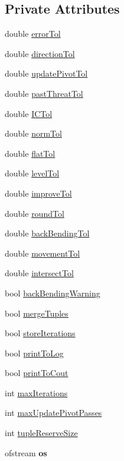 \subsection*{Private Attributes}
\begin{DoxyCompactItemize}
\item 
double \hyperlink{classSGEnv_a2b680d79a2bbb0e27b710bba29c6d407}{error\-Tol}
\item 
double \hyperlink{classSGEnv_a1e3560dd1c3ba8a6c4186dfaa1c5af4e}{direction\-Tol}
\item 
double \hyperlink{classSGEnv_a621566e738d47ab9929ffa704b05aa63}{update\-Pivot\-Tol}
\item 
double \hyperlink{classSGEnv_a61ed41e3ef6d9b6a19aef48a63a73cba}{past\-Threat\-Tol}
\item 
double \hyperlink{classSGEnv_afbb390530ed115e2478ef574ab2781c8}{I\-C\-Tol}
\item 
double \hyperlink{classSGEnv_af55398623fd3c53009f27d7563cc552d}{norm\-Tol}
\item 
double \hyperlink{classSGEnv_a45e50f610abb5155028317046f6bd2ec}{flat\-Tol}
\item 
double \hyperlink{classSGEnv_aafaa79c12a4d99238914ca3375d5fb1c}{level\-Tol}
\item 
double \hyperlink{classSGEnv_af5c8453c8d759ea826b066b22bfa73fd}{improve\-Tol}
\item 
double \hyperlink{classSGEnv_a0a354af36c33f1860aa62729d9773e09}{round\-Tol}
\item 
double \hyperlink{classSGEnv_a5be9cb731e7dbe68eb18e08b28a28842}{back\-Bending\-Tol}
\item 
double \hyperlink{classSGEnv_a6354c8a9cde7ae64f8e087ab489956af}{movement\-Tol}
\item 
double \hyperlink{classSGEnv_a7ff6bedc734e8a7f2f24fc60cd9ba4e9}{intersect\-Tol}
\item 
bool \hyperlink{classSGEnv_a34be0dccccc949656a20f5355dcdac47}{back\-Bending\-Warning}
\item 
bool \hyperlink{classSGEnv_af76edb443f16969deeaa0b308269a221}{merge\-Tuples}
\item 
bool \hyperlink{classSGEnv_a8ee7f43e894dd5a23865344a547c68bc}{store\-Iterations}
\item 
bool \hyperlink{classSGEnv_a4200d165b83a050e52b9a2f8c5e60581}{print\-To\-Log}
\item 
bool \hyperlink{classSGEnv_a9130f5ec6bc17593fea6705cffcdea6f}{print\-To\-Cout}
\item 
int \hyperlink{classSGEnv_abc462c4d56ad63f56a4b3376acd59654}{max\-Iterations}
\item 
int \hyperlink{classSGEnv_a4c41c1b8036d4cd3e70cea3016d422cd}{max\-Update\-Pivot\-Passes}
\item 
int \hyperlink{classSGEnv_ab98e2a00eb89a84a6167875b83b1cbc3}{tuple\-Reserve\-Size}
\item 
\hypertarget{classSGEnv_ac975f41a0c35197960138e934b11e3d1}{ofstream {\bfseries os}}\label{classSGEnv_ac975f41a0c35197960138e934b11e3d1}

\end{DoxyCompactItemize}
